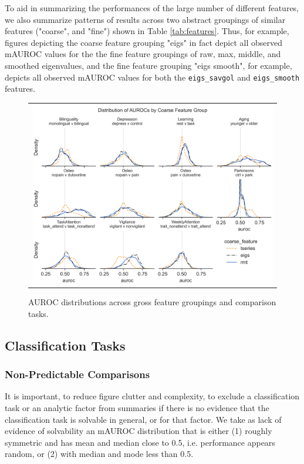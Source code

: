 \documentclass[12pt]{spieman}  %
\newcommand{\code}[1]{\small\texttt{#1}\normalsize}
\begin{document}
\begin{spacing}{2}
To aid in summarizing the performances of the large number of different
features, we also summarize patterns of results across two abstract groupings
of similar features ("coarse", and "fine") shown in Table \ref{tab:features}.
Thus, for example, figures depicting the coarse feature grouping "eigs" in fact
depict all observed mAUROC values for the the fine feature groupings of raw,
max, middle, and smoothed eigenvalues, and the fine feature grouping "eigs
smooth", for example, depicts all observed mAUROC values for both the
\code{eigs\_savgol} and \code{eigs\_smooth} features.


\begin{figure}
\begin{center}
\begin{tabular}{c}
\includegraphics[width=6.5in]{coarse_feature_overall_by_subgroup.png}
\end{tabular}
\end{center}
\caption
{ \label{fig:main-results}
AUROC distributions across gross feature groupings and comparison tasks.}
\end{figure}

\subsection{Classification Tasks}

\subsubsection{Non-Predictable Comparisons}

It is important, to reduce figure clutter and complexity, to exclude a
classification task or an analytic factor from summaries if there is no
evidence that the classification task is solvable in general, or for that
factor. We take as lack of evidence of solvability an mAUROC distribution that
is either (1) roughly symmetric and has mean and median close to 0.5, i.e.
performance appears random, or (2) with median and mode less than 0.5.


\end{spacing}
\end{document}
